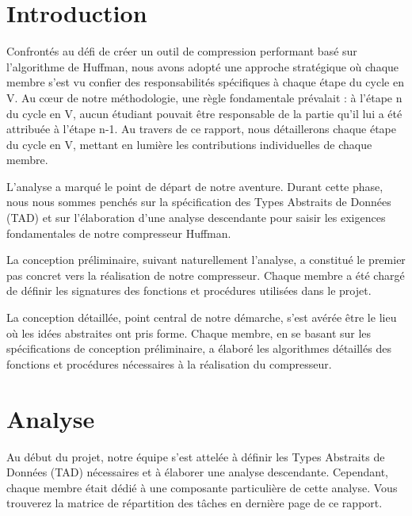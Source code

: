 \documentclass[12pt]{article}
\begin{document}
    
    \newpage


    \section{Introduction}
    Confrontés au défi de créer un outil de compression performant basé sur l'algorithme de Huffman, nous avons adopté une approche stratégique où chaque membre s'est vu confier des responsabilités spécifiques à chaque étape du cycle en V. Au cœur de notre méthodologie, une règle fondamentale prévalait : à l'étape n du cycle en V, aucun étudiant pouvait être responsable de la partie qu'il lui a été attribuée à l'étape n-1. Au travers de ce rapport, nous détaillerons chaque étape du cycle en V, mettant en lumière les contributions individuelles de chaque membre. \par
    L'analyse a marqué le point de départ de notre aventure. Durant cette phase, nous nous sommes penchés sur la spécification des Types Abstraits de Données (TAD) et sur l'élaboration d'une analyse descendante pour saisir les exigences fondamentales de notre compresseur Huffman.\par
    La conception préliminaire, suivant naturellement l'analyse, a constitué le premier pas concret vers la réalisation de notre compresseur. Chaque membre a été chargé de définir les signatures des fonctions et procédures utilisées dans le projet. \par
    La conception détaillée, point central de notre démarche, s'est avérée être le lieu où les idées abstraites ont pris forme. Chaque membre, en se basant sur les spécifications de conception préliminaire, a élaboré les algorithmes détaillés des fonctions et procédures nécessaires à la réalisation du compresseur.
    \newpage

    \tableofcontents

    \listoffigures


    \newpage


    \section{Analyse}
    Au début du projet, notre équipe s'est attelée à définir les Types Abstraits de Données (TAD) nécessaires et à élaborer une analyse descendante. Cependant, chaque membre était dédié à une composante particulière de cette analyse. Vous trouverez la matrice de répartition des tâches en dernière page de ce rapport.\newline
\end{document}
